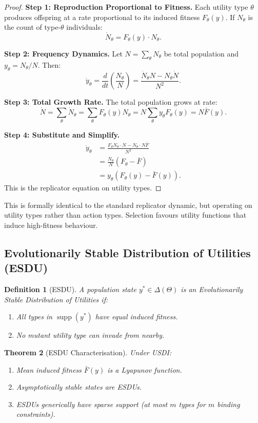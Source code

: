 \documentclass[12pt]{article}
\newtheorem{theorem}{Theorem}[section]
\newtheorem{definition}[theorem]{Definition}
\DeclareMathOperator{\supp}{supp}
\begin{document}
\begin{proof}
\textbf{Step 1: Reproduction Proportional to Fitness.}
Each utility type $\theta$ produces offspring at a rate proportional to its induced fitness $F_\theta(y)$. If $N_\theta$ is the count of type-$\theta$ individuals:
\[
\dot{N}_\theta = F_\theta(y) \cdot N_\theta.
\]

\textbf{Step 2: Frequency Dynamics.}
Let $N = \sum_\theta N_\theta$ be total population and $y_\theta = N_\theta / N$. Then:
\[
\dot{y}_\theta = \frac{d}{dt} \left( \frac{N_\theta}{N} \right) = \frac{\dot{N}_\theta N - N_\theta \dot{N}}{N^2}.
\]

\textbf{Step 3: Total Growth Rate.}
The total population grows at rate:
\[
\dot{N} = \sum_\theta \dot{N}_\theta = \sum_\theta F_\theta(y) N_\theta = N \sum_\theta y_\theta F_\theta(y) = N \bar{F}(y).
\]

\textbf{Step 4: Substitute and Simplify.}
\begin{align*}
\dot{y}_\theta &= \frac{F_\theta N_\theta \cdot N - N_\theta \cdot N \bar{F}}{N^2} \\
&= \frac{N_\theta}{N} \left( F_\theta - \bar{F} \right) \\
&= y_\theta \left( F_\theta(y) - \bar{F}(y) \right).
\end{align*}
This is the replicator equation on utility types.
\end{proof}

This is formally identical to the standard replicator dynamic, but operating on utility types rather than action types. Selection favours utility functions that induce high-fitness behaviour.

\subsection{Evolutionarily Stable Distribution of Utilities (ESDU)}

\begin{definition}[ESDU]
A population state $y^* \in \Delta(\Theta)$ is an \emph{Evolutionarily Stable Distribution of Utilities} if:
\begin{enumerate}
    \item All types in $\supp(y^*)$ have equal induced fitness.
    \item No mutant utility type can invade from nearby.
\end{enumerate}
\end{definition}

\begin{theorem}[ESDU Characterisation]
\label{thm:esdu}
Under USDI:
\begin{enumerate}
    \item[(a)] Mean induced fitness $\bar{F}(y)$ is a Lyapunov function.
    \item[(b)] Asymptotically stable states are ESDUs.
    \item[(c)] ESDUs generically have sparse support (at most $m$ types for $m$ binding constraints).
\end{enumerate}
\end{theorem}
\end{document}
